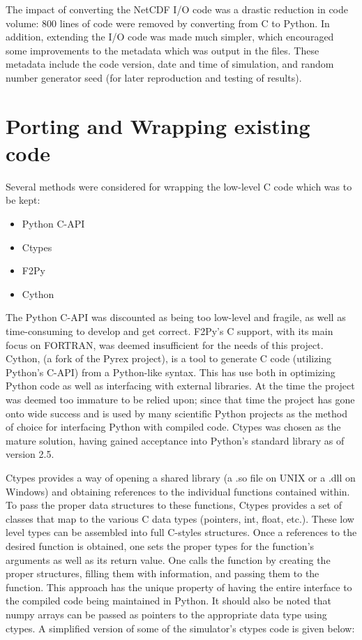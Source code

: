 \documentclass[twocolumn]{article}
\begin{document}
The impact of converting the NetCDF I/O code was a drastic reduction in code
volume: 800 lines of code were removed by converting from C to Python. In
addition, extending the I/O code was made much simpler, which encouraged
some improvements to the metadata which was output in the files. These metadata
include the code version, date and time of simulation, and random number generator
seed (for later reproduction and testing of results).

\section{Porting and Wrapping existing code}
Several methods were considered for wrapping the low-level C code which was to
be kept:
\begin{itemize}
    \item Python C-API
    \item Ctypes
    \item F2Py
    \item Cython
\end{itemize}
The Python C-API was discounted as being too low-level and fragile, as well
as time-consuming to develop and get correct.  F2Py's C support, with its
main focus on FORTRAN, was deemed insufficient for the needs of this project.
Cython, (a fork of the Pyrex project), is a tool to generate C code (utilizing
Python's C-API) from a Python-like syntax. This has use both in optimizing
Python code as well as interfacing with external libraries. At the time the
project was deemed too immature to be relied upon; since that time the project
has gone onto wide success and is used by many scientific Python projects
as the method of choice for interfacing Python with compiled code. Ctypes was
chosen as the mature solution, having gained acceptance into Python's standard
library as of version 2.5. \citep{CTYPES REFERENCE}

Ctypes provides a way of opening a shared library (a .so file on UNIX or a .dll
on Windows) and obtaining references to the individual functions contained
within. To pass the proper data structures to these functions, Ctypes provides
a set of classes that map to the various C data types (pointers, int, float, etc.).
These low level types can be assembled into full C-styles structures. Once a references
to the desired function is obtained, one sets the proper types for the function's
arguments as well as its return value. One calls the function by creating the
proper structures, filling them with information, and passing them to the function.
This approach has the unique property of having the entire interface to the compiled
code being maintained in Python. It should also be noted that numpy arrays
can be passed as pointers to the appropriate data type using ctypes.
A simplified version of some of the simulator's ctypes code is given below:

\end{document}
